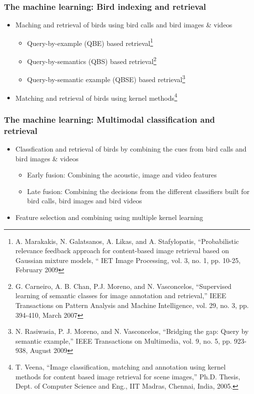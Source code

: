 \documentclass[mathserif]{beamer}
\begin{document}
\begin{frame}
\frametitle{The machine learning: Bird indexing and retrieval}
\begin{itemize}
\item<2-> Maching and retrieval of birds using bird calls and bird images \& videos
\begin{itemize}
      \item Query-by-example (QBE) based retrieval\footnote{
	A. Marakakis, N. Galatsanos, A. Likas, and A. Stafylopatis, “Probabilistic relevance feedback approach for content-based image retrieval based on Gaussian mixture models, “ IET Image Processing, vol. 3, no. 1, pp. 10-25, February 2009}
      \item Query-by-semantics (QBS) based retrieval\footnote{
	G. Carneiro, A. B. Chan, P.J. Moreno, and N. Vasconcelos, “Supervised learning of semantic classes for image annotation and retrieval,” IEEE Transactions on Pattern Analysis and Machine Intelligence, vol. 29, no. 3, pp. 394-410, March 2007}
      \item Query-by-semantic example (QBSE) based retrieval\footnote{
	N. Rasiwasia, P. J. Moreno, and N. Vasconcelos, “Bridging the gap: Query by semantic example,” IEEE Transactions on Multimedia, vol. 9, no. 5, pp. 923-938, August 2009}
\end{itemize}
\item<3-> Matching and retrieval of birds using kernel methods\footnote{
	T. Veena, “Image classification, matching and annotation using kernel methods for content based image retrieval for scene images,” Ph.D. Thesis, Dept. of Computer Science and Eng., IIT Madras, Chennai, India, 2005.}   
\end{itemize}
\end{frame}

\begin{frame}
\frametitle{The machine learning: Multimodal classification and retrieval}
\begin{itemize}
\item<2-> Classfication and retrieval of birds by combining the cues from bird calls and bird images \& videos
\begin{itemize}
      \item Early fusion: Combining the acoustic, image and video features
      \item Late fusion: Combining the decisions from the different classifiers built for bird calls, bird images and bird videos
 \end{itemize}
\item<3-> Feature selection and combining using multiple kernel learning
\end{itemize}
\end{frame}
\end{document}
